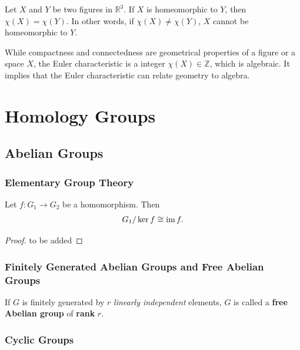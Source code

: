 \documentclass[10pt]{article}
\begin{document}
\begin{theorem}
    Let $X$ and $Y$ be two figures in $\mathbb{R}^3$.
    If $X$ is homeomorphic to $Y$, then $\chi(X)=\chi(Y)$.
    In other words, if $\chi(X)\neq\chi(Y)$, $X$ cannot be homeomorphic to $Y$.
\end{theorem}
While compactness and connectedness are geometrical properties of a figure or a space $X$, the Euler characteristic is a integer $\chi(X)\in\mathbb{Z}$, which is algebraic.
It implies that the Euler characteristic can relate geometry to algebra.

\clearpage
\section{Homology Groups}
\subsection{Abelian Groups}
\subsubsection{Elementary Group Theory}

\begin{theorem}
    Let $f:G_1\to G_2$ be a homomorphism. Then
    \begin{align}
        G_1/\ker f\cong \operatorname{im} f.
    \end{align}
\end{theorem}
\begin{proof}
    to be added
\end{proof}

\subsubsection{Finitely Generated Abelian Groups and Free Abelian Groups}
\begin{definition}
    If $G$ is finitely generated by $r$ \textit{linearly independent} elements, $G$ is called a \textbf{free Abelian group} of \textbf{rank} $r$.
\end{definition}

\subsubsection{Cyclic Groups}
\end{document}
